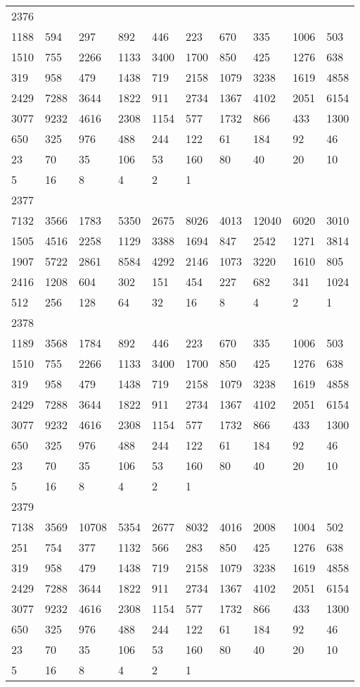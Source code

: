 \begin{longtable}{*{10}{l}}
2376&&&&&&&&&\\
1188& 594& 297& 892& 446& 223& 670& 335& 1006& 503\\
1510& 755& 2266& 1133& 3400& 1700& 850& 425& 1276& 638\\
319& 958& 479& 1438& 719& 2158& 1079& 3238& 1619& 4858\\
2429& 7288& 3644& 1822& 911& 2734& 1367& 4102& 2051& 6154\\
3077& 9232& 4616& 2308& 1154& 577& 1732& 866& 433& 1300\\
650& 325& 976& 488& 244& 122& 61& 184& 92& 46\\
23& 70& 35& 106& 53& 160& 80& 40& 20& 10\\
5& 16& 8& 4& 2& 1& \\

2377&&&&&&&&&\\
7132& 3566& 1783& 5350& 2675& 8026& 4013& 12040& 6020& 3010\\
1505& 4516& 2258& 1129& 3388& 1694& 847& 2542& 1271& 3814\\
1907& 5722& 2861& 8584& 4292& 2146& 1073& 3220& 1610& 805\\
2416& 1208& 604& 302& 151& 454& 227& 682& 341& 1024\\
512& 256& 128& 64& 32& 16& 8& 4& 2& 1\\

2378&&&&&&&&&\\
1189& 3568& 1784& 892& 446& 223& 670& 335& 1006& 503\\
1510& 755& 2266& 1133& 3400& 1700& 850& 425& 1276& 638\\
319& 958& 479& 1438& 719& 2158& 1079& 3238& 1619& 4858\\
2429& 7288& 3644& 1822& 911& 2734& 1367& 4102& 2051& 6154\\
3077& 9232& 4616& 2308& 1154& 577& 1732& 866& 433& 1300\\
650& 325& 976& 488& 244& 122& 61& 184& 92& 46\\
23& 70& 35& 106& 53& 160& 80& 40& 20& 10\\
5& 16& 8& 4& 2& 1& \\

2379&&&&&&&&&\\
7138& 3569& 10708& 5354& 2677& 8032& 4016& 2008& 1004& 502\\
251& 754& 377& 1132& 566& 283& 850& 425& 1276& 638\\
319& 958& 479& 1438& 719& 2158& 1079& 3238& 1619& 4858\\
2429& 7288& 3644& 1822& 911& 2734& 1367& 4102& 2051& 6154\\
3077& 9232& 4616& 2308& 1154& 577& 1732& 866& 433& 1300\\
650& 325& 976& 488& 244& 122& 61& 184& 92& 46\\
23& 70& 35& 106& 53& 160& 80& 40& 20& 10\\
5& 16& 8& 4& 2& 1& \\


\end{longtable}

